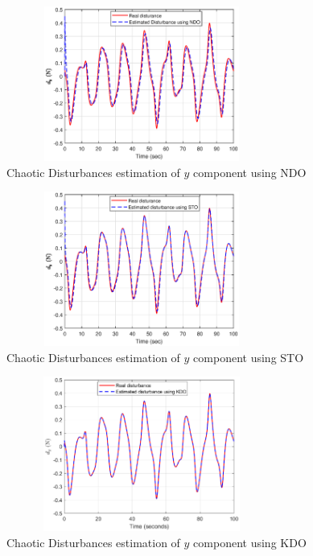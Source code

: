 \documentclass[letterpaper%
, twoside%
, 12pt%
,memoire%
, english%
,creativecommons,hyperref%
]{thETS}
\begin{document}
\begin{figure}[H]
\centering
\includegraphics[width=3.5in,height=2in]{Figures/results/chaotic_2_estimates/dis_m2_est_y_ndo.eps}
\caption{Chaotic Disturbances estimation of $y$ component using NDO}
\label{dis_m2_est_y_ndo}
\end{figure}

\begin{figure}[H]
\centering
\includegraphics[width=3.5in,height=2in]{Figures/results/chaotic_2_estimates/dis_m2_est_y_sto.eps}
\caption{Chaotic Disturbances estimation of $y$ component using STO}
\label{dis_m2_est_y_sto}
\end{figure}

\begin{figure}[H]
\centering
\includegraphics[width=3.5in,height=2in]{Figures/results/chaotic_2_estimates/dis_m2_est_y_kdo.eps}
\caption{Chaotic Disturbances estimation of $y$ component using KDO}
\label{dis_m2_est_y_kdo}
\end{figure}
\end{document}
